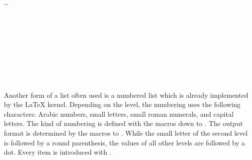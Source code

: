 \begin{Declaration}
  \\
  \quad{}\\
  \quad\dots\\
  \\
  \\
  \\
  \\
  \\
  \\
  \\
  \\
\end{Declaration}%
%
%
%
%
%
%
%
%
%
%
Another form of a list often used is a numbered list which is already
implemented by the {\LaTeX} kernel. Depending on the level, the
numbering uses the following characters: Arabic numbers,
small letters, small roman numerals, and capital letters. The kind of numbering
is defined with the macros  down to . The
output format is determined by the macros  to
. While the small letter of the second level is followed by
a round parenthesis, the values of all other levels are followed by a
dot. Every item is introduced with .%
\ifCommonmaincls
